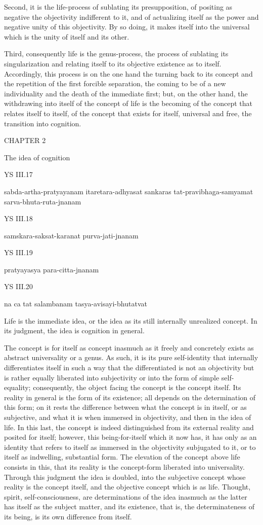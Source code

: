 Second, it is the life-process of sublating its presupposition,
of positing as negative the objectivity indifferent to it,
and of actualizing itself as the power
and negative unity of this objectivity.
By so doing, it makes itself into the universal
which is the unity of itself and its other.

Third, consequently life is the genus-process,
the process of sublating its singularization
and relating itself to its objective existence
as to itself.
Accordingly, this process is
on the one hand the turning back to its concept
and the repetition of the first forcible separation,
the coming to be of a new individuality
and the death of the immediate first;
but, on the other hand, the withdrawing into itself
of the concept of life is the becoming of
the concept that relates itself to itself,
of the concept that exists for itself,
universal and free, the transition into cognition.

CHAPTER 2

The idea of cognition

YS III.17

    sabda-artha-pratyayanam itaretara-adhyasat sankaras tat-pravibhaga-samyamat sarva-bhuta-ruta-jnanam

YS III.18

    samskara-saksat-karanat purva-jati-jnanam

YS III.19

    pratyayasya para-citta-jnanam

YS III.20

    na ca tat salambanam tasya-avisayi-bhutatvat

Life is the immediate idea, or the idea as
its still internally unrealized concept.
In its judgment, the idea is cognition in general.

The concept is for itself as concept
inasmuch as it freely and concretely exists
as abstract universality or a genus.
As such, it is its pure self-identity
that internally differentiates itself
in such a way that the differentiated is
not an objectivity but is rather
equally liberated into subjectivity
or into the form of simple self-equality;
consequently, the object facing
the concept is the concept itself.
Its reality in general is the form of its existence;
all depends on the determination of this form;
on it rests the difference between
what the concept is in itself, or as subjective,
and what it is when immersed in objectivity,
and then in the idea of life.
In this last, the concept is indeed distinguished
from its external reality and posited for itself;
however, this being-for-itself which it now has,
it has only as an identity that refers to itself
as immersed in the objectivity subjugated to it,
or to itself as indwelling, substantial form.
The elevation of the concept above life consists in this,
that its reality is the concept-form liberated into universality.
Through this judgment the idea is doubled,
into the subjective concept whose reality is the concept itself,
and the objective concept which is as life.
Thought, spirit, self-consciousness, are determinations
of the idea inasmuch as the latter has itself
as the subject matter, and its existence, that is, the determinateness
of its being, is its own difference from itself.

